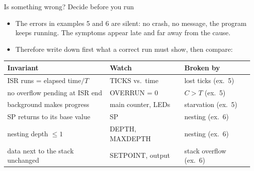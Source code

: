 \begin{frame}{Is something wrong? Decide before you run}
  \begin{itemize}
    \item The errors in examples 5 and 6 are \alert{silent}: no crash, no message, the program keeps running. The symptoms appear late and far away from the cause.
    \item Therefore write down first what a correct run must show, then compare:
  \end{itemize}
  \begin{center}\footnotesize
  \begin{tabular}{@{}lll@{}}
    \toprule
    Invariant & Watch & Broken by \\
    \midrule
    ISR runs = elapsed time$/T$ & TICKS vs.\ time & lost ticks (ex.~5) \\
    no overflow pending at ISR end & OVERRUN = 0 & $C > T$ (ex.~5) \\
    background makes progress & main counter, LEDs & starvation (ex.~5) \\
    SP returns to its base value & SP & nesting (ex.~6) \\
    nesting depth $\le 1$ & DEPTH, MAXDEPTH & nesting (ex.~6) \\
    data next to the stack unchanged & SETPOINT, output & stack overflow (ex.~6) \\
    \bottomrule
  \end{tabular}
  \end{center}
\end{frame}


